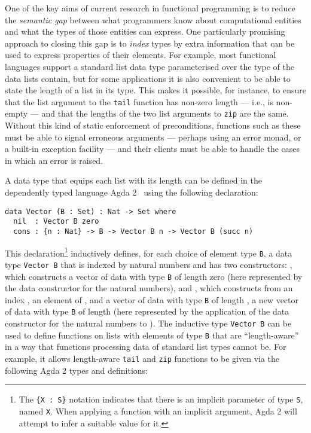 \documentclass{LMCS}
\begin{document}
One of the key aims of current research in functional programming is
to reduce the {\em semantic gap} between what programmers know about
computational entities and what the types of those entities can
express. One particularly promising approach to closing this gap is to
{\em index} types by extra information that can be used to express
properties of their elements. For example, most functional languages
support a standard list data type parameterised over the type of the
data lists contain, but for some applications it is also convenient to
be able to state the length of a list in its type. This makes it
possible, for instance, to ensure that the list argument to the
\verb|tail| function has non-zero length --- i.e., is non-empty ---
and that the lengths of the two list arguments to \verb|zip| are the
same. Without this kind of static enforcement of preconditions,
functions such as these must be able to signal erroneous arguments ---
perhaps using an error monad, or a built-in exception facility --- and
their clients must be able to handle the cases in which an error is
raised.

A data type that equips each list with its length can be defined in
the dependently typed language Agda 2~\cite{agda10} using the
following declaration:
\begin{verbatim}
data Vector (B : Set) : Nat -> Set where
  nil  : Vector B zero
  cons : {n : Nat} -> B -> Vector B n -> Vector B (succ n)
\end{verbatim}

\noindent
This declaration\footnote{The \texttt{\{X : S\}} notation indicates
  that there is an implicit parameter of type \texttt{S}, named
  \texttt{X}. When applying a function with an implicit argument, Agda
  2 will attempt to infer a suitable value for it.} inductively
defines, for each choice of element type \verb|B|, a data type
\verb|Vector B| that is indexed by natural numbers and has two
constructors: , which constructs a vector of data with
type \verb|B| of length zero (here represented by the data constructor
 for the natural numbers), and ,
which constructs from an index , an element of
, and a vector of data with type \verb|B| of length
, a new vector of data with type \verb|B| of length
 (here represented by the application
 of the data constructor
 for the natural numbers to ). The
inductive type \verb|Vector B| can be used to define functions on
lists with elements of type \verb|B| that are ``length-aware'' in a
way that functions processing data of standard list types cannot
be. For example, it allows length-aware \verb|tail| and \verb|zip|
functions to be given via the following Agda 2 types and definitions:
\end{document}
